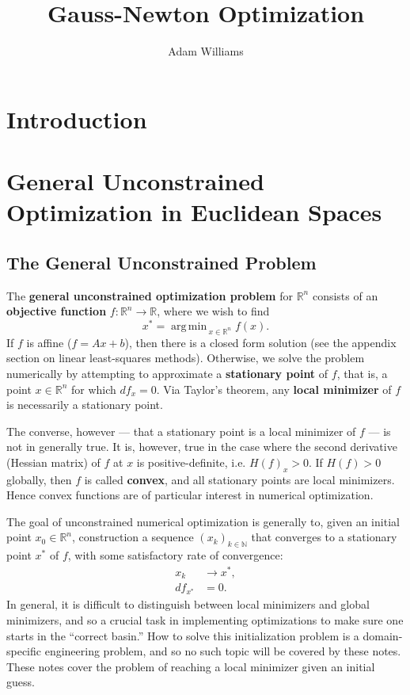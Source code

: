 \documentclass[reqno]{amsart}
\title{Gauss-Newton Optimization}
\author{Adam Williams}
\DeclareMathOperator*{\argmin}{arg\,min\,}
\numberwithin{equation}{section}
\begin{document}
\maketitle

\tableofcontents

\section{Introduction}

\section{General Unconstrained Optimization in Euclidean Spaces}

\subsection{The General Unconstrained Problem}

The \textbf{general unconstrained optimization problem} for $\mathbb R^n$ consists of
an \textbf{objective function} $f : \mathbb R^n \to \mathbb R$, where we wish to find
$$
    x^* = \argmin_{x \in \mathbb R^n} f(x).
$$
If $f$ is affine ($f = Ax + b$), then there is a closed form solution (see the appendix
section on linear least-squares methods). Otherwise, we solve the problem numerically
by attempting to approximate a \textbf{stationary point} of $f$, that is, a point
$x \in \mathbb R^n$ for which $df_x = 0$. Via Taylor's theorem, any
\textbf{local minimizer} of $f$ is necessarily a stationary point.

The converse, however --- that a stationary point is a local minimizer of $f$ ---
is not in generally true. It is, however, true in the case where the second
derivative (Hessian matrix) of $f$ at $x$ is positive-definite, i.e. $H(f)_x > 0$. If
$H(f) > 0$ globally, then $f$ is called \textbf{convex}, and all stationary
points are local minimizers. Hence convex functions are of particular interest
in numerical optimization.

The goal of unconstrained numerical optimization is generally to, given an initial
point $x_0 \in \mathbb R^n$, construction a sequence $(x_k)_{k \in \mathbb N}$
that converges to a stationary point $x^*$ of $f$, with some satisfactory rate of
convergence:
\begin{align*}
    x_k &\to x^*, \\
    df_{x^*} &= 0.
\end{align*}
In general, it is difficult to distinguish between local minimizers and global minimizers,
and so a crucial task in implementing optimizations to make sure one starts in the
``correct basin.'' How to solve this initialization problem is a domain-specific
engineering problem, and so no such topic will be covered by these notes. These notes
cover the problem of reaching a local minimizer given an initial guess.
\end{document}
